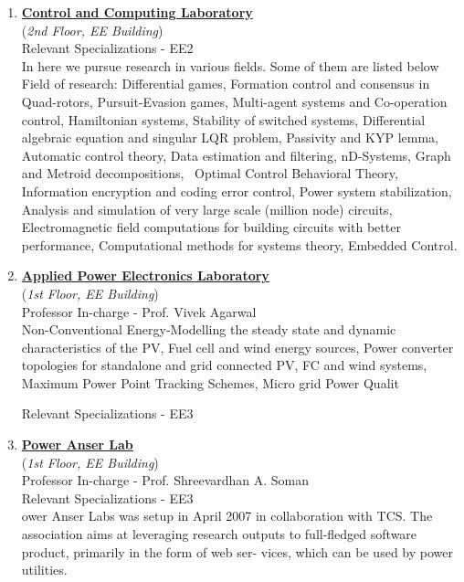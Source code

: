 \documentclass[openany]{book} %
\begin{document}
\begin{enumerate}
\item \href{https://www.ee.iitb.ac.in/~ccgroup} {\color{blue} \textbf{Control and Computing Laboratory}}\\
    (\textit{2nd Floor, EE Building})\\
Relevant Specializations - EE2\\
In here we pursue research in various fields. Some of them are listed below
Field of research: Differential games, Formation control and consensus in Quad-rotors, Pursuit-Evasion games, Multi-agent systems and Co-operation control, Hamiltonian systems, Stability of switched systems, Differential algebraic equation and singular LQR problem, Passivity and KYP lemma, Automatic control theory, Data estimation and filtering, nD-Systems, Graph and Metroid decompositions,  Optimal Control Behavioral Theory, Information encryption and coding error control, Power system stabilization, Analysis and simulation of very large scale (million node) circuits, Electromagnetic field computations for building circuits with better performance, Computational methods for systems theory, Embedded Control.


\item \href{https://www.ee.iitb.ac.in/~apel/} {\color{blue} \textbf{Applied Power Electronics Laboratory}}\\
    (\textit{1st Floor, EE Building})\\
Professor In-charge - Prof. Vivek Agarwal\\
Non-Conventional Energy-Modelling the steady state and dynamic characteristics of the PV, Fuel
cell and wind energy sources, Power converter topologies for standalone and grid connected PV,
FC and wind systems, Maximum Power Point Tracking Schemes, Micro grid Power Qualit

Relevant Specializations - EE3\\
\item \href{https://www.ee.iitb.ac.in/web/research/labs/poweranser} {\color{blue} \textbf{Power Anser Lab}}\\
    (\textit{1st Floor, EE Building})\\
Professor In-charge - Prof. Shreevardhan A. Soman\\
Relevant Specializations - EE3\\
ower Anser Labs was setup in April 2007 in collaboration with TCS. The association aims at
leveraging research outputs to full-fledged software product, primarily in the form of web ser-
vices, which can be used by power utilities.


\end{enumerate}
\end{document}
